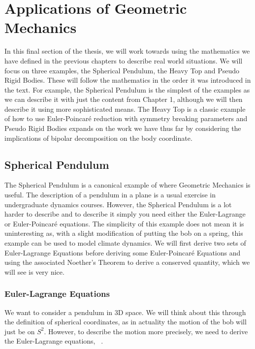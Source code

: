 
\section{Applications of Geometric Mechanics}
In this final section of the thesis, we will work towards using the mathematics we have defined in the previous chapters to describe real world situations. We will focus on three examples, the Spherical Pendulum, the Heavy Top and Pseudo Rigid Bodies. These will follow the mathematics in the order it was introduced in the text. For example, the Spherical Pendulum is the simplest of the examples as we can describe it with just the content from Chapter 1, although we will then describe it using more sophisticated means. The Heavy Top is a classic example of how to use Euler-Poincar\'e reduction with symmetry breaking parameters and Pseudo Rigid Bodies expands on the work we have thus far by considering the implications of bipolar decomposition on the body coordinate.

\subsection{Spherical Pendulum}
The Spherical Pendulum is a canonical example of where Geometric Mechanics is useful. The description of a pendulum in a plane is a usual exercise in undergraduate dynamics courses. However, the Spherical Pendulum is a lot harder to describe and to describe it simply you need either the Euler-Lagrange or Euler-Poincar\'e equations. The simplicity of this example does not mean it is uninteresting as, with a slight modification of putting the bob on a spring, this example can be used to model climate dynamics. We will first derive two sets of Euler-Lagrange Equations before deriving some Euler-Poincar\'e Equations and using the associated Noether's Theorem to derive a conserved quantity, which we will see is very nice.

\subsubsection{Euler-Lagrange Equations}

We want to consider a pendulum in 3D space. We will think about this through the definition of spherical coordinates, as in actuality the motion of the bob will just be on $S^2$. However, to describe the motion more precisely, we need to derive the Euler-Lagrange equations, ~\cite{holm_2011}.\\

